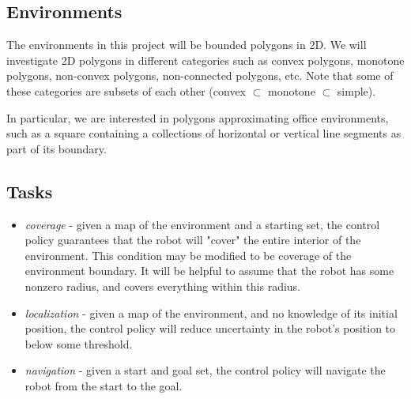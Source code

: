 \documentclass{article}
\theoremstyle{definition}
\theoremstyle{remark}
\begin{document}
\subsection{Environments}

The environments in this project will be bounded polygons in 2D. We will investigate 2D polygons in different categories such as convex polygons, monotone polygons, non-convex polygons, non-connected polygons, etc. Note that some of these categories are subsets of each other (convex $\subset$ monotone $\subset$ simple).

In particular, we are interested in polygons approximating office environments, such as a square containing a collections of horizontal or vertical line segments as part of its boundary.

\subsection{Tasks}

\begin{itemize}[noitemsep]
    \item \emph{coverage} - given a map of the environment and a starting set, the control policy guarantees that the robot will "cover" the entire interior of the environment. This condition may be modified to be coverage of the environment boundary. It will be helpful to assume that the robot has some nonzero radius, and covers everything within this radius.
    \item \emph{localization} - given a map of the environment, and no knowledge of its initial position, the control policy will reduce uncertainty in the robot's position to below some threshold.
    \item \emph{navigation} - given a start and goal set, the control policy will navigate the robot from the start to the goal.
\end{itemize}
\end{document}
